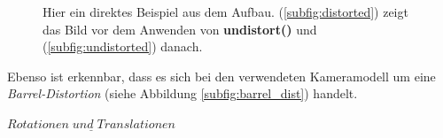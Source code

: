 		\begin{figure}[h]
			\centering
			\caption[Beispiel für die Verzerrung in Bildern]{Hier ein direktes Beispiel aus dem Aufbau. (\ref{subfig:distorted}) zeigt das Bild vor dem Anwenden von \textbf{undistort()} und (\ref{subfig:undistorted}) danach.}
			\label{fig:distortion_bsp}
		\end{figure}
	
		Ebenso ist erkennbar, dass es sich bei den verwendeten Kameramodell um eine \textit{Barrel-Distortion} (siehe Abbildung \ref{subfig:barrel_dist}) handelt.
		
		$\underline{Rotationen \; und \; Translationen}$
		
